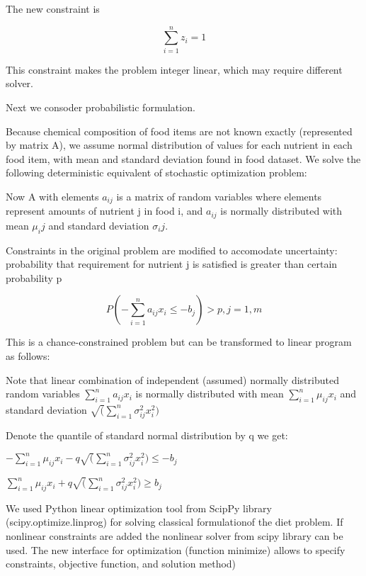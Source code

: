 {{{The new constraint is


   \begin{equation} %
    \sum_{i=1}^{n}z_i=1
    \end{equation}

This constraint makes the problem integer linear, which may require different solver.

Next we consoder probabilistic formulation.

Because chemical composition of food items are not known exactly (represented by matrix A), we assume normal distribution of values for each nutrient in each food item, with mean and standard deviation found in food dataset. We solve the following deterministic equivalent of stochastic optimization problem:

Now A with elements $a_{ij}$ is a matrix of random variables where elements represent amounts of nutrient j in food i, and $a_{ij}$ is normally distributed with mean $\mu_ij$ and standard deviation $\sigma_ij$. 


Constraints in the original problem are modified to accomodate uncertainty: probability that requirement for nutrient j is satisfied is greater than certain probability p 

   \begin{equation} %
  P(  -\sum_{i=1}^{n}{a_{ij}x_i}\le - b_j) >p, j=1,m
    \end{equation}

This is a chance-constrained problem but can be transformed to linear program as follows:

Note that linear combination  of independent (assumed) normally distributed random variables $\sum_{i=1}^{n}{a_{ij}x_i}$ is normally distributed with mean  $\sum_{i=1}^{n}{\mu_{ij}x_i}$  and standard deviation  $\sqrt (\sum_{i=1}^{n}{\sigma_{ij}^2x_i^2})$ 

Denote the quantile of standard normal distribution by q we get:

$-\sum_{i=1}^{n}{\mu_{ij}x_i}-q \sqrt (\sum_{i=1}^{n}{\sigma_{ij}^2x_i^2}) \le -b_j$ 

$\sum_{i=1}^{n}{\mu_{ij}x_i}+q \sqrt (\sum_{i=1}^{n}{\sigma_{ij}^2x_i^2}) \ge b_j$ 


We used Python linear optimization tool  from ScipPy library (scipy.optimize.linprog) for solving classical formulationof the diet problem. If nonlinear constraints are added the nonlinear solver from scipy library can be used. The new interface for optimization (function minimize) allows to specify constraints, objective function, and solution method)

}}}

